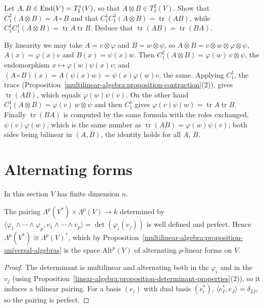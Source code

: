 \begin{exercise}\label{multilinear-algebra:exercise-contraction-composition}
Let $A, B \in \operatorname{End}(V) = T^1_1(V)$, so that $A \otimes B \in T^2_2(V)$. Show that $C^2_1(A \otimes B) = A \circ B$ and that $C^1_1C^2_1(A \otimes B) = \operatorname{tr}(AB)$, while
$C^1_1C^1_1(A \otimes B) = \operatorname{tr}A\operatorname{tr}B$. Deduce that $\operatorname{tr}(AB) = \operatorname{tr}(BA)$.
\end{exercise}

\begin{solution}
By linearity we may take $A = v \otimes \varphi$ and $B = w \otimes \psi$, so $A \otimes B = v \otimes w \otimes \varphi \otimes \psi$, $A(x) = \varphi(x)v$ and $B(x) = \psi(x)w$. Then
$C^2_1(A \otimes B) = \varphi(w)\,v \otimes \psi$, the endomorphism $x \mapsto \varphi(w)\psi(x)v$; and $(A \circ B)(x) = A(\psi(x)w) = \psi(x)\varphi(w)v$, the same. Applying $C^1_1$, the trace
(Proposition~\ref{multilinear-algebra:proposition-contraction}(2)), gives $\operatorname{tr}(AB)$, which equals $\varphi(w)\psi(v)$. On the other hand $C^1_1(A \otimes B) = \varphi(v)\,w \otimes \psi$
and then $C^1_1$ gives $\varphi(v)\psi(w) = \operatorname{tr}A\operatorname{tr}B$. Finally $\operatorname{tr}(BA)$ is computed by the same formula with the roles exchanged, $\psi(v)\varphi(w)$,
which is the same number as $\operatorname{tr}(AB) = \varphi(w)\psi(v)$; both sides being bilinear in $(A, B)$, the identity holds for all $A$, $B$.
\end{solution}

\section{Alternating forms}\label{multilinear-algebra:section-alternating-forms}

In this section $V$ has finite dimension $n$.

\begin{proposition}\label{multilinear-algebra:proposition-dual-exterior}
The pairing $\Lambda^p(V^*) \times \Lambda^p(V) \to k$ determined by
$\langle \varphi_1 \wedge \cdots \wedge \varphi_p, v_1 \wedge \cdots \wedge v_p \rangle = \det(\varphi_i(v_j))$ is well defined and perfect. Hence
$\Lambda^p(V^*) \cong \Lambda^p(V)^*$, which by Proposition~\ref{multilinear-algebra:proposition-universal-algebras}
is the space $\mathrm{Alt}^p(V)$ of alternating $p$-linear forms on $V$.
\end{proposition}

\begin{proof}
The determinant is multilinear and alternating both in the $\varphi_i$ and in the $v_j$ (using
Proposition~\ref{linear-algebra:proposition-determinant-properties}(2)), so it induces a bilinear pairing.
For a basis $(e_i)$ with dual basis $(e_i^*)$, $\langle e_I^*, e_J \rangle = \delta_{IJ}$, so the pairing is perfect.
\end{proof}

